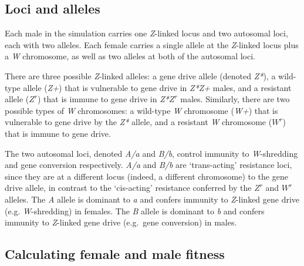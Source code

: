 \documentclass[]{rsos}%
\begin{document}
\hypertarget{loci-and-alleles}{%
\subsection{Loci and alleles}\label{loci-and-alleles}}

Each male in the simulation carries one \emph{Z}-linked locus and two
autosomal loci, each with two alleles. Each female carries a single
allele at the \emph{Z}-linked locus plus a \emph{W} chromosome, as well
as two alleles at both of the autosomal loci.

There are three possible \emph{Z}-linked alleles: a gene drive allele
(denoted \emph{Z*}), a wild-type allele (\emph{Z+}) that is vulnerable
to gene drive in \emph{Z*Z+} males, and a resistant allele (\(Z^r\))
that is immune to gene drive in \emph{Z*}\(Z^r\) males. Similarly, there
are two possible types of \emph{W} chromosomes: a wild-type \emph{W}
chromosome (\emph{W+}) that is vulnerable to gene drive by the \emph{Z*}
allele, and a resistant \emph{W} chromosome (\(W^r\)) that is immune to
gene drive.

The two autosomal loci, denoted \emph{A/a} and \emph{B/b}, control
immunity to \emph{W}-shredding and gene conversion respectively.
\emph{A/a} and \emph{B/b} are `trans-acting' resistance loci, since they
are at a different locus (indeed, a different chromosome) to the gene
drive allele, in contrast to the `cis-acting' resistance conferred by
the \(Z^r\) and \(W^r\) alleles. The \emph{A} allele is dominant to
\emph{a} and confers immunity to \emph{Z}-linked gene drive (e.g.
\emph{W}-shredding) in females. The \emph{B} allele is dominant to
\emph{b} and confers immunity to \emph{Z}-linked gene drive (e.g.~gene
conversion) in males.

\hypertarget{calculating-female-and-male-fitness}{%
\subsection{Calculating female and male
fitness}\label{calculating-female-and-male-fitness}}
\end{document}
